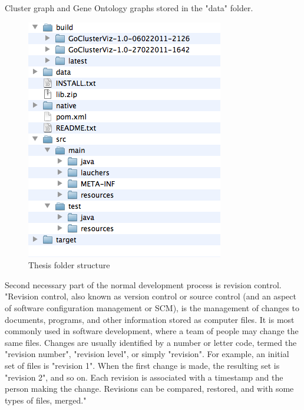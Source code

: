\documentclass[a4paper,oneside]{article}
\begin{document}
Cluster graph and Gene Ontology graphs stored in the "data" folder.

\begin{figure}
\begin{center}
	\includegraphics[scale=0.6]{pictures/thesis_folder_structure.png}
	\caption{Thesis folder structure}
	\label{THESIS_FOLDER_STRUCTURE}
\end{center}
\end{figure}

Second necessary part of the normal development process is revision control. "Revision control, also known as version control or source control (and an aspect of software configuration management or SCM), is the management of changes to documents, programs, and other information stored as computer files. It is most commonly used in software development, where a team of people may change the same files. Changes are usually identified by a number or letter code, termed the "revision number", "revision level", or simply "revision". For example, an initial set of files is "revision 1". When the first change is made, the resulting set is "revision 2", and so on. Each revision is associated with a timestamp and the person making the change. Revisions can be compared, restored, and with some types of files, merged."~\cite{REVISION_CONTROL} 
\end{document}
